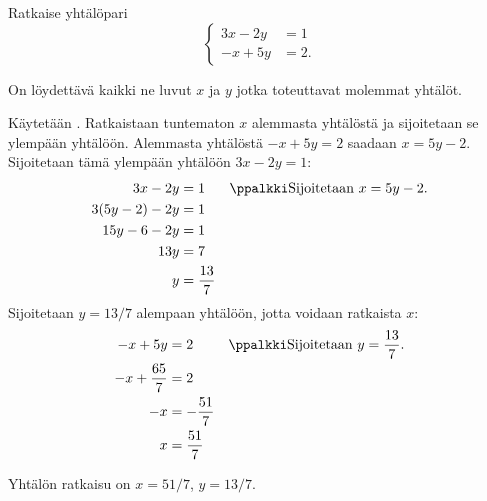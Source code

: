\begin{esimerkki}
Ratkaise yhtälöpari
\[
\left\{
\begin{aligned}
3x-2y&= 1 \\
-x+5y&= 2.
\end{aligned}
\right.
\]
\begin{esimratk}
On löydettävä kaikki ne luvut $x$ ja $y$ jotka toteuttavat molemmat yhtälöt.

Käytetään . Ratkaistaan tuntematon $x$ alemmasta yhtälöstä ja sijoitetaan se ylempään yhtälöön. Alemmasta yhtälöstä $-x+5y= 2$ saadaan $x=5y-2$. Sijoitetaan tämä ylempään yhtälöön $3x-2y=1$:
\begin{align*}
3x-2y&=1 && \ppalkki \text{Sijoitetaan $x=5y-2$.} \\
3(5y-2)-2y&=1 && \\
15y-6-2y&=1 && \\
13y&=7 && \\
y&=\frac{13}{7} && \\
\end{align*}
Sijoitetaan $y=13/7$ alempaan yhtälöön, jotta voidaan ratkaista $x$:
\begin{align*}
-x+5y&= 2 && \ppalkki \text{Sijoitetaan $y=\frac{13}{7}$.} \\
-x+\frac{65}{7}&= 2 && \\
-x&= -\frac{51}{7}&& \\
x&= \frac{51}{7}&&
\end{align*}
\end{esimratk}
\begin{esimvast}
Yhtälön ratkaisu on $x= 51/7$, $y=13/7$.
\end{esimvast}
\end{esimerkki}

